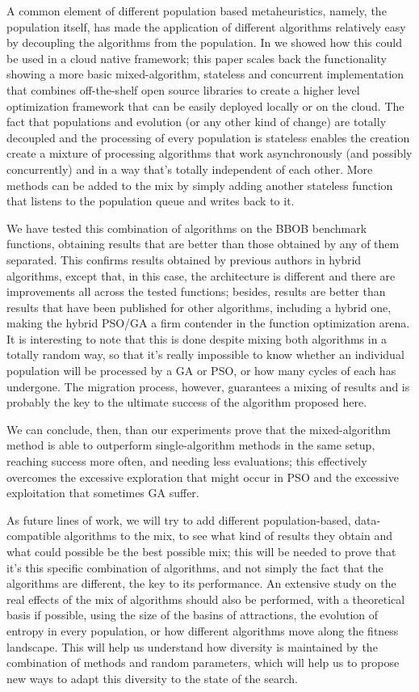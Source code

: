 \documentclass[runningheads]{llncs}
\begin{document}
{A common element of different population based metaheuristics, namely,
the population itself, has made the application of different
algorithms relatively easy by decoupling the algorithms from the
population. In \cite{GARCIAVALDEZ2021234} we showed how this
could be used in a cloud native framework; this paper scales back the
functionality showing a more basic mixed-algorithm, stateless and
concurrent implementation that combines off-the-shelf open source
libraries to create a higher level optimization framework that can be
easily deployed locally or on the cloud. The fact that populations and evolution (or any other kind of
change) are totally decoupled and the processing of every population
is stateless enables the creation create a mixture of processing algorithms that work
asynchronously (and possibly concurrently) and in a way that's totally
independent of each other. More methods can be added to the mix by simply
adding another stateless function that listens to the population queue
and writes back to it.

We have tested this combination of algorithms on the BBOB benchmark
functions, obtaining results that are better than those obtained by
any of them separated. This confirms results obtained by previous
authors in hybrid algorithms, except that, in this case, the
architecture is different and 
there are improvements all across the tested functions; besides,
results are better than results that have been published for other
algorithms, including a hybrid one, making the hybrid PSO/GA a firm
contender in the function optimization arena.
It is interesting to note that this is done despite mixing both
algorithms in a totally random way, so that it's really impossible to
know whether an individual population will be processed by a GA or
PSO, or how many cycles of each has undergone. The migration process,
however, guarantees a mixing of results and is probably the key to the
ultimate success of the algorithm proposed here.

We can conclude, then, than our experiments prove that the mixed-algorithm method is able to
outperform single-algorithm methods in the same setup, reaching
success more often, and needing less evaluations; this effectively
overcomes the excessive exploration that might occur in PSO and the
excessive exploitation that sometimes GA suffer.

As future lines of work, we will try to add different
population-based, data-compatible algorithms to the mix, to see what
kind of results they obtain and what could possible be the best
possible mix; this will be needed to prove that it's this specific
combination of algorithms, and not simply the fact that the algorithms
are different, the key to its performance. An extensive study on the
real effects of the mix of algorithms should also be performed, with a
theoretical basis if possible, using the size of the basins of
attractions, the evolution of entropy in every population, or how
different algorithms move along the fitness landscape. This will help
us understand how diversity is maintained by the combination of
methods and random parameters, which will help us to propose new ways
to adapt this diversity to the state of the search.

}
\end{document}
